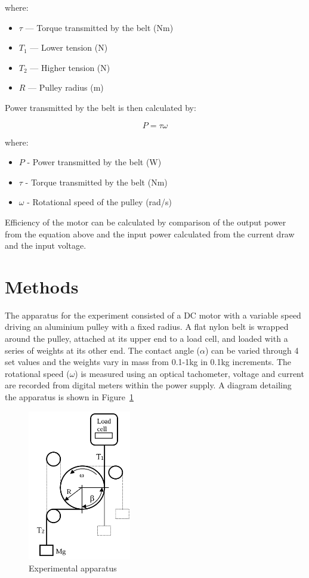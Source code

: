 \documentclass[a4paper,12pt]{article}
\begin{document}
where:
\begin{itemize}
    \item \( \tau \) — Torque transmitted by the belt (Nm)
    \item \( T_1 \) — Lower tension (N)
    \item \( T_2 \) — Higher tension (N)
    \item \( R \) — Pulley radius (m)
\end{itemize}

Power transmitted by the belt is then calculated by:

\begin{equation}
    P = \tau\omega
    \label{eq:power}
\end{equation}


where:
\begin{itemize}
    \item \(P\) - Power transmitted by the belt (W)
    \item \(\tau\) - Torque transmitted by the belt (Nm)
    \item \(\omega\) - Rotational speed of the pulley (rad/s)
\end{itemize}

Efficiency of the motor can be calculated by comparison of the output power from the equation above and the input power calculated from the current draw and the input voltage.

\section{Methods}
The apparatus for the experiment consisted of a DC motor with a variable speed driving an aluminium pulley with a fixed radius. A flat nylon belt is wrapped around the pulley, attached at its upper end to a load cell, and loaded with a series of weights at its other end. The contact angle ($\alpha$) can be varied through 4 set values and the weights vary in mass from 0.1-1kg in 0.1kg increments. The rotational speed ($\omega$) is measured using an optical tachometer, voltage and current are recorded from digital meters within the power supply.
A diagram detailing the apparatus is shown in Figure~\ref{fig:apparatus}


\begin{figure}[h]
    \centering
    \includegraphics[width=0.4\textwidth]{figures/apparatus.png} 
    \caption{Experimental apparatus}
    \label{fig:apparatus}
\end{figure}
\end{document}
